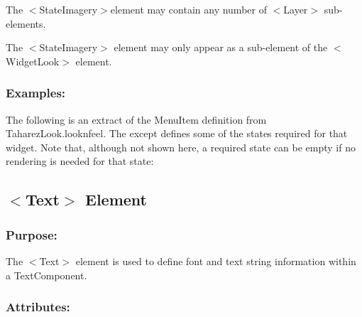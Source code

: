 \begin{DoxyItemize}
\item The {\ttfamily $<$State\+Imagery$>$element} may contain any number of {\ttfamily $<$Layer$>$} sub-\/elements. 
\item The {\ttfamily $<$State\+Imagery$>$} element may only appear as a sub-\/element of the {\ttfamily $<$Widget\+Look$>$} element. 
\end{DoxyItemize}\hypertarget{fal_element_ref_fal_elem_ref_sec_30_4}{}\subsubsection{Examples\+:}\label{fal_element_ref_fal_elem_ref_sec_30_4}
The following is an extract of the Menu\+Item definition from Taharez\+Look.\+looknfeel. The except defines some of the states required for that widget. Note that, although not shown here, a required state can be empty if no rendering is needed for that state\+: 
\begin{DoxyCode}{0}
\end{DoxyCode}
\hypertarget{fal_element_ref_fal_elem_ref_sec_31}{}\subsection{$<$\+Text$>$ Element}\label{fal_element_ref_fal_elem_ref_sec_31}
\hypertarget{fal_element_ref_fal_elem_ref_sec_31_1}{}\subsubsection{Purpose\+:}\label{fal_element_ref_fal_elem_ref_sec_31_1}
The {\ttfamily $<$Text$>$} element is used to define font and text string information within a Text\+Component.\hypertarget{fal_element_ref_fal_elem_ref_sec_31_2}{}\subsubsection{Attributes\+:}\label{fal_element_ref_fal_elem_ref_sec_31_2}
